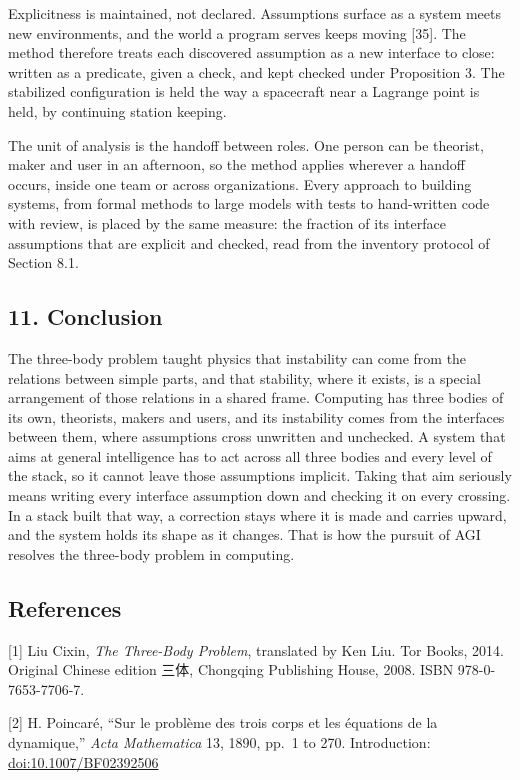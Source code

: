 \documentclass[
  10pt,
]{article}
\begin{document}
Explicitness is maintained, not declared. Assumptions surface as a
system meets new environments, and the world a program serves keeps
moving {[}35{]}. The method therefore treats each discovered assumption
as a new interface to close: written as a predicate, given a check, and
kept checked under Proposition 3. The stabilized configuration is held
the way a spacecraft near a Lagrange point is held, by continuing
station keeping.

The unit of analysis is the handoff between roles. One person can be
theorist, maker and user in an afternoon, so the method applies wherever
a handoff occurs, inside one team or across organizations. Every
approach to building systems, from formal methods to large models with
tests to hand-written code with review, is placed by the same measure:
the fraction of its interface assumptions that are explicit and checked,
read from the inventory protocol of Section 8.1.

\subsection{11. Conclusion}\label{conclusion}

The three-body problem taught physics that instability can come from the
relations between simple parts, and that stability, where it exists, is
a special arrangement of those relations in a shared frame. Computing
has three bodies of its own, theorists, makers and users, and its
instability comes from the interfaces between them, where assumptions
cross unwritten and unchecked. A system that aims at general
intelligence has to act across all three bodies and every level of the
stack, so it cannot leave those assumptions implicit. Taking that aim
seriously means writing every interface assumption down and checking it
on every crossing. In a stack built that way, a correction stays where
it is made and carries upward, and the system holds its shape as it
changes. That is how the pursuit of AGI resolves the three-body problem
in computing.

\subsection{References}\label{references}

{[}1{]} Liu Cixin, \emph{The Three-Body Problem}, translated by Ken Liu.
Tor Books, 2014. Original Chinese edition 三体, Chongqing Publishing
House, 2008. ISBN 978-0-7653-7706-7.

{[}2{]} H. Poincaré, ``Sur le problème des trois corps et les équations
de la dynamique,'' \emph{Acta Mathematica} 13, 1890, pp.~1 to 270.
Introduction:
\href{https://doi.org/10.1007/BF02392506}{doi:10.1007/BF02392506}
\end{document}
